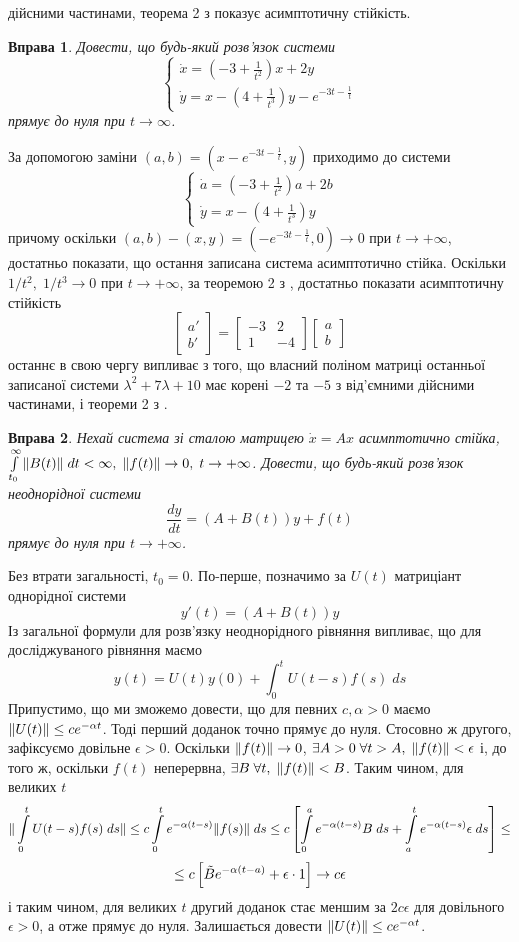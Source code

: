 \documentclass[12pt]{article} %
\newtheorem{prob}{Вправа}
\begin{document}
дійсними частинами, теорема 2 з \cite[\S8]{demidovich} показує асимптотичну стійкість.
\begin{prob}Довести, що будь-який розв’язок системи 
\[\begin{cases}\dot{x}=(-3+\frac{1}{t^2})x+2y\\\dot{y}=x-(4+\frac{1}{t^3})y-e^{-3t-\frac{1}{t}}\end{cases}\]
прямує до нуля при $t\to\infty$.\end{prob}
За допомогою заміни $(a,b)=(x-e^{-3t-\frac{1}{t}},y)$ приходимо до системи
\[\begin{cases}\dot{a}=(-3+\frac{1}{t^2})a+2b\\\dot{y}=x-(4+\frac{1}{t^3})y\end{cases}\]
причому оскільки $(a,b)-(x,y)=(-e^{-3t-\frac{1}{t}},0)\to0$ при $t\to+\infty$, достатньо показати, що остання записана
система асимптотично стійка. Оскільки
$1/t^2,\;1/t^3\to0$ при $t\to+\infty$, за теоремою 2 з \cite[\S12]{demidovich}, достатньо показати асимптотичну стійкість
\[\begin{bmatrix}a'\\b'\end{bmatrix}=\begin{bmatrix}-3&2\\1&-4\end{bmatrix}\begin{bmatrix}a\\b\end{bmatrix}\]
останнє в свою чергу випливає з того, що власний поліном матриці останньої записаної системи $\lambda^2+7\lambda+10$ має корені
$-2$ та $-5$ з від’ємними дійсними частинами, і теореми 2 з \cite[\S8]{demidovich}.
\begin{prob}Нехай система зі сталою матрицею $\dot{x}=Ax$ асимптотично стійка, $\int_{t_0}^\infty\mynorm{B(t)}\;dt<\infty,\;\mynorm{f(t)}\to0,\;
t\to+\infty$. Довести, що будь-який розв’язок неоднорідної системи\[\frac{dy}{dt}=(A+B(t))y+f(t)\]прямує до нуля при $t\to+\infty$.\end{prob}
Без втрати загальності, $t_0=0$. По-перше, позначимо за $U(t)$ матриціант однорідної системи
\[y'(t)=(A+B(t))y\]
Із загальної формули для розв’язку неоднорідного рівняння випливає, що для досліджуваного рівняння маємо
\[y(t)=U(t)y(0)+\int_0^tU(t-s)f(s)\;ds\]
Припустимо, що ми зможемо довести, що для певних $c,\alpha>0$ маємо $\|U(t)\|\leq ce^{-\alpha t}$. Тоді перший доданок точно прямує до нуля.
Стосовно ж другого, зафіксуємо довільне $\epsilon>0$. Оскільки $\|f(t)\|\to0$, $\exists A>0\;\forall t>A,\;\|f(t)\|<\epsilon$ і, до того ж,
оскільки $f(t)$ неперервна, $\exists B\;\forall t,\;\|f(t)\|<B$. Таким чином, для великих $t$
\[\mynorm{\int_0^tU(t-s)f(s)\;ds}\leq c\int_0^te^{-\alpha (t-s)}\mynorm{f(s)}\;ds\leq c\mysbra{\int_0^ae^{-\alpha(t-s)}B\;ds+\int_a^te^{-
\alpha(t-s)}\epsilon\;ds}\leq\]
\[\leq c\left[\tilde{B}e^{-\alpha(t-a)}+\epsilon\cdot1\right]\to c\epsilon\]
і таким чином, для великих $t$ другий доданок стає меншим за $2c\epsilon$ для довільного $\epsilon>0$, а отже прямує до нуля. Залишається довести
$\|U(t)\|\leq ce^{-\alpha t}$.
\end{document}
